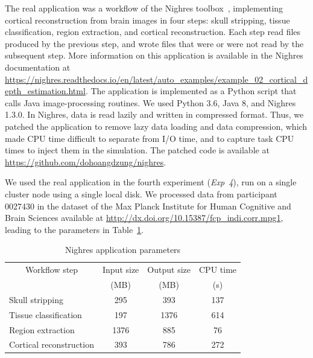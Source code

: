 The real application was a workflow of the Nighres 
toolbox~\cite{huntenburg2018nighres}, implementing cortical reconstruction 
from brain images in four steps: skull stripping, tissue classification, 
region extraction, and cortical reconstruction. 
Each step read files produced by the previous step, and wrote files that 
were or were not read by the subsequent step.
More information on this application is available in the Nighres
documentation at
\url{https://nighres.readthedocs.io/en/latest/auto_examples/example_02_cortical_depth_estimation.html}.
The application is implemented as a Python script that calls Java
image-processing routines. We used Python 3.6, Java 8, and Nighres 1.3.0. 
In Nighres, data is read lazily and written in compressed format.
Thus, we patched the application to remove lazy data loading and data compression, 
which made CPU time difficult to separate from I/O time, and to capture task 
CPU times to inject them in the simulation. 
The patched code is available at \url{https://github.com/dohoangdzung/nighres}.

We used the real application in the fourth experiment (\textit{Exp~4}), 
run on a single cluster node using a single local disk. 
We processed data from participant 0027430 in the dataset of the 
Max Planck Institute for Human Cognitive and Brain Sciences available at
\url{http://dx.doi.org/10.15387/fcp_indi.corr.mpg1}, 
leading to the parameters in Table~\ref{table:nighres_stats}.

\begin{table}[!h]
    \centering
    \begin{tabular}{lccc}
    \toprule
        \multicolumn{1}{c}{Workflow step}& Input size       & Output size      & CPU time\\
                               & (MB)             & (MB)             & (s)\\
    \midrule
       Skull stripping         &  295             & 393               & 137 \\
       Tissue classification   &  197              & 1376              & 614 \\
       Region extraction       &  1376             & 885              & 76 \\
       Cortical reconstruction &  393              & 786              & 272\\
    \bottomrule
    \end{tabular} 
    \caption{Nighres application parameters}
    \label{table:nighres_stats}
\end{table}

